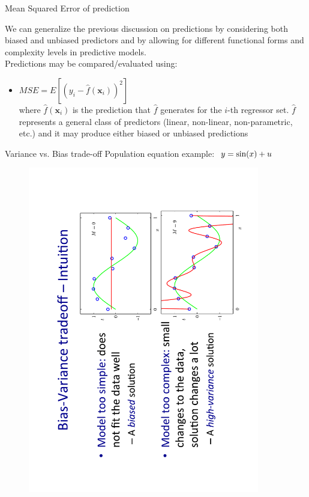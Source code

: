 \documentclass{beamer}
\begin{document}
\begin{frame}{Mean Squared Error of prediction}

We can generalize the previous discussion on predictions by considering both biased and unbiased predictors and by allowing for different functional forms and complexity levels in predictive models. \\ \bigskip 
Predictions may be compared/evaluated using:

\medskip
\begin{itemize}
   \item $\textit{MSE} = E
   \left[ \left( y_i - \hat{f}(\bm{x}_i) \right)^2 \right]$\\
   \smallskip
   where $\hat{f}(\bm{x}_i)$ is the prediction that $\hat{f}$ generates for the $i$-th regressor set. $\hat{f}$ represents a general class of predictors (linear, non-linear, non-parametric, etc.) and it may produce either biased or unbiased predictions
\end{itemize}
\end{frame}
\begin{frame}{Variance vs. Bias trade-off}
Population equation example: $~y = \textnormal{sin}(x)+u$
\vspace{-1cm}
\begin{figure}
\includegraphics[angle=270,trim = 0cm 1cm 0cm 0cm, clip,width=0.9\textwidth]{img/VarBias.pdf}
\end{figure}
\end{frame}
\end{document}
